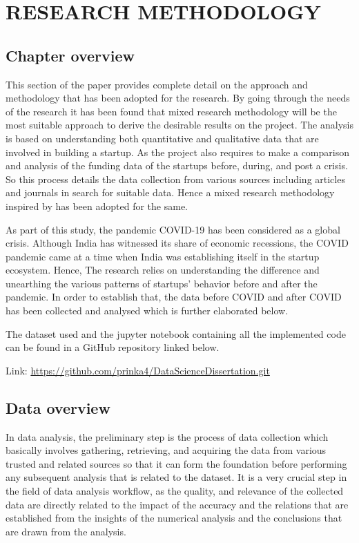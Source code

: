 \documentclass[12pt]{article}
\begin{document}
\newpage
\section{RESEARCH METHODOLOGY}

\subsection{Chapter overview}

This section of the paper provides complete detail on the approach and methodology that has been adopted for the research. By going through the needs of the research it has been found that mixed research methodology will be the most suitable approach to derive the desirable results on the project. The analysis is based on understanding both quantitative and qualitative data that are involved in building a startup. As the project also requires to make a comparison and analysis of the funding data of the startups before, during, and post a crisis. So this process details the data collection from various sources including articles and journals in search for suitable data. Hence a mixed research methodology inspired by \citep{dawadi2021mixed} has been adopted for the same.

As part of this study, the pandemic COVID-19 has been considered as a global crisis. Although India has witnessed its share of economic recessions, the COVID pandemic came at a time when India was establishing itself in the startup ecosystem. Hence, The research relies on understanding the difference and unearthing the various patterns of startups' behavior before and after the pandemic. In order to establish that, the data before COVID and after COVID has been collected and analysed which is further elaborated below.

The dataset used and the jupyter notebook containing all the implemented code can be found in a GitHub repository \citep{githubGitHubPrinka4DataScienceDissertation} linked below.

Link: \url{https://github.com/prinka4/DataScienceDissertation.git}

\subsection{Data overview}

In data analysis, the preliminary step is the process of data collection which basically involves gathering, retrieving, and acquiring the data from various trusted and related sources so that it can form the foundation before performing any subsequent analysis that is related to the dataset. It is a very crucial step in the field of data analysis workflow, as the quality, and relevance of the collected data are directly related to the impact of the accuracy and the relations that are established from the insights of the numerical analysis and the conclusions that are drawn from the analysis.
\end{document}
